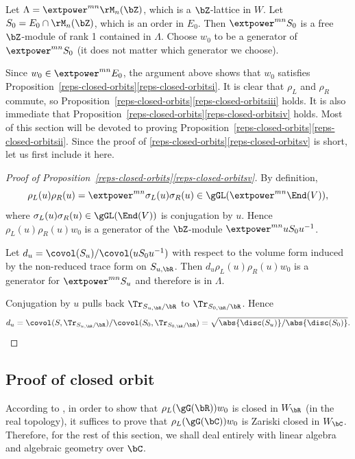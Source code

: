 Let $\Lambda = \extpower^{mn} \rM_n(\bZ)$, which is a $\bZ$-lattice in $W$.
Let $S_0 = E_0 \cap \rM_n(\bZ)$, which is an order in $E_0$.
Then $\extpower^{mn} S_0$ is a free $\bZ$-module of rank 1 contained in $\Lambda$.
Choose $w_0$ to be a generator of $\extpower^{mn} S_0$ (it does not matter which generator we choose).

Since $w_0 \in \extpower^{mn} E_0$, the argument above shows that $w_0$ satisfies Proposition~\ref{reps-closed-orbits}\eqref{reps-closed-orbitsi}.
It is clear that $\rho_L$ and $\rho_R$ commute, so Proposition~\ref{reps-closed-orbits}\eqref{reps-closed-orbitsiii} holds.
It is also immediate that Proposition~\ref{reps-closed-orbits}\eqref{reps-closed-orbitsiv} holds.
Most of this section will be devoted to proving Proposition~\ref{reps-closed-orbits}\eqref{reps-closed-orbitsii}.
Since the proof of \ref{reps-closed-orbits}\eqref{reps-closed-orbitsv} is short, let us first include it here.

\begin{proof}[Proof of Proposition~\ref{reps-closed-orbits}\eqref{reps-closed-orbitsv}]
By definition,
\[
\rho_L(u) \rho_R(u) = \extpower^{mn} \sigma_L(u)\sigma_R(u) \in \gGL(\extpower^{mn} \End(V)),
\]
where $\sigma_L(u)\sigma_R(u) \in \gGL(\End(V))$ is conjugation by $u$.
Hence $\rho_L(u)\rho_R(u)w_0$ is a generator of the $\bZ$-module $\extpower^{mn} uS_0u^{-1}$.

Let $d_u = \covol(S_u)/\covol(uS_0u^{-1})$ with respect to the volume form induced by the non-reduced trace form on $S_{u,\bR}$.
Then $d_u\rho_L(u)\rho_R(u)w_0$ is a generator for $\extpower^{mn} S_u$ and therefore is in $\Lambda$.

Conjugation by $u$ pulls back $\Tr_{S_{u,\bR}/\bR}$ to $\Tr_{S_{0,\bR}/\bR}$.
Hence
\[
d_u = \covol(S, \Tr_{S_{u,\bR}/\bR})/\covol(S_0, \Tr_{S_{0,\bR}/\bR}) = \sqrt{\abs{\disc(S_u)}/\abs{\disc(S_0)}}.
\qedhere
\]
\end{proof}

\subsection{Proof of closed orbit}

According to \cite[Prop.\,6.3]{BHC62}, in order to show that $\rho_L(\gG(\bR))w_0$ is closed in $W_\bR$ (in the real topology), it suffices to prove that $\rho_L(\gG(\bC))w_0$ is Zariski closed in $W_\bC$.
Therefore, for the rest of this section, we shall deal entirely with linear algebra and algebraic geometry over $\bC$.

